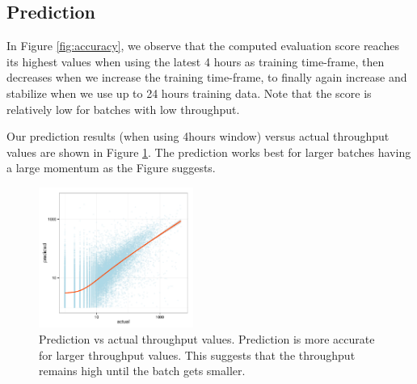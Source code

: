 \subsection{Prediction}
In Figure \ref{fig:accuracy}, we observe that the computed evaluation score reaches its highest values when using the latest 4 hours as training time-frame, then decreases when we increase the training time-frame, to finally again increase and stabilize when we use up to 24 hours training data.
Note that the score is relatively low for batches with low throughput. 

Our prediction results (when using 4hours window) versus actual throughput values are shown in Figure \ref{fig:pred}. The prediction works best for larger batches having a large momentum as the Figure suggests.



\begin{figure}[t!]
	\centering
		\includegraphics[width=0.45\textwidth]{figures/predictions_3}
	\caption{Prediction vs actual throughput values. Prediction is more accurate for larger throughput values. This suggests that the throughput remains high until the batch gets smaller.}
	\label{fig:pred}
\end{figure}


